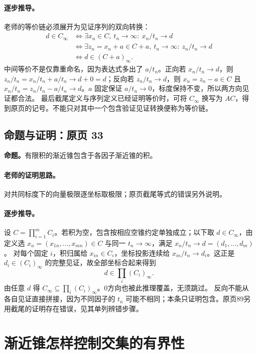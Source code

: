 \documentclass[11pt,a4paper]{article}
\theoremstyle{definition}\newtheorem{definition}{定义}\newtheorem{example}{例}
\begin{document}
\paragraph{逐步推导。}
老师的等价链必须展开为见证序列的双向转换：
\begin{align*}
d\in C_\infty
&\iff\exists x_n\in C,\ t_n\to\infty:\ x_n/t_n\to d\\
&\iff\exists z_n=x_n+a\in C+a,\ t_n\to\infty:\ z_n/t_n\to d\\
&\iff d\in(C+a)_\infty.
\end{align*}
中间等价不是仅靠重命名，因为表达式多出了 $a/t_n$。正向若 $x_n/t_n\to d$，则 $z_n/t_n=x_n/t_n+a/t_n\to d+0=d$；反向若 $z_n/t_n\to d$，则 $x_n=z_n-a\in C$ 且 $x_n/t_n=z_n/t_n-a/t_n\to d$。$a$ 固定保证 $a/t_n\to0$，标度保持不变，所以两方向见证都合法。
最后截尾定义与序列定义已经证明等价时，可将 $C_\infty$ 换写为 $AC$，得到原页的记号。不能只对其中一个包含验证见证转换便称为等价链。


\subsection{命题与证明：原页 33}

\textbf{命题。}有限积的渐近锥包含于各因子渐近锥的积。

\paragraph{老师的证明思路。}对共同标度下的向量极限逐坐标取极限；原页截尾等式的错误另外说明。

\paragraph{逐步推导。}
设 $C=\prod_{i=1}^mC_i$。若积为空，包含按相应空锥约定单独成立；以下取 $d\in C_\infty$，由定义选 $x_n=(x_{1n},\ldots,x_{mn})\in C$ 与同一 $t_n\to\infty$，满足 $x_n/t_n\to d=(d_1,\ldots,d_m)$。
对每个固定 $i$，积归属给 $x_{in}\in C_i$，坐标投影连续给 $x_{in}/t_n\to d_i$。这正是 $d_i\in(C_i)_\infty$ 的完整见证，故全部坐标合起来得到
\[d\in\prod_i(C_i)_\infty.\]
由任意 $d$ 得 $C_\infty\subseteq\prod_i(C_i)_\infty$。0方向也被此推理覆盖，无须跳过。
反向不能从各自见证直接拼接，因为不同因子的 $t_n$ 可能不相同；本条只证明包含。原页89另用截尾的证明存在错误，见其单列辨错步骤。


\clearpage\section{渐近锥怎样控制交集的有界性}\label{g:109:34}
\end{document}
